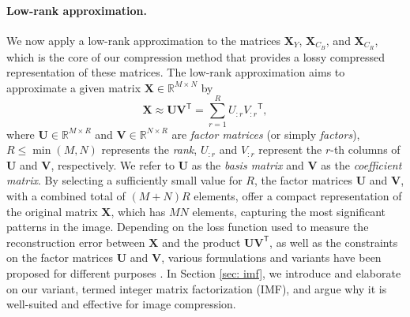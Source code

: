 \paragraph{Low-rank approximation.} 
We now apply a low-rank approximation to the matrices $\bm{X}_{Y}$, $\bm{X}_{C_B}$, and $\bm{X}_{C_R}$, which is the core of our compression method that provides a lossy compressed representation of these matrices.  The low-rank approximation \citep{eckart1936approximation} aims to approximate a given matrix $ \bm{X} \in \mathbb{R}^{M \times N} $ by 
\begin{equation} \label{eq: lra}
	\bm{X} \approx \bm{U} \bm{V}^\mathsf{T} = \sum_{r=1}^{R} U_{:r} {V_{:r}}^\mathsf{T},
\end{equation} 
where $\bm{U} \in \mathbb{R}^{M \times R}$ and $\bm{V} \in \mathbb{R}^{N \times R}$ are \emph{factor matrices} (or simply \emph{factors}), $R \leq \min(M,N)$ represents the \emph{rank}, $U_{:r}$ and $V_{:r}$ represent the $r$-th columns of $\bm{U}$ and $\bm{V}$, respectively. We refer to $\bm{U}$ as the \emph{basis matrix} and $\bm{V}$ as the \emph{coefficient matrix}. By selecting a sufficiently small value for $R$, the factor matrices $\bm{U}$ and $\bm{V}$, with a combined total of $(M+N)R$ elements, offer a compact representation of the original matrix $\bm{X}$, which has $MN$ elements, capturing the most significant patterns in the image. Depending on the loss function used to measure the reconstruction error between $\bm{X}$ and the product $\bm{U} \bm{V}^\mathsf{T}$, as well as the constraints on the factor matrices $\bm{U}$ and $\bm{V}$, various formulations and variants have been proposed for different purposes . In Section \ref{sec: imf}, we introduce and elaborate on our variant, termed integer matrix factorization (IMF), and argue why it is well-suited and effective for image compression. 

